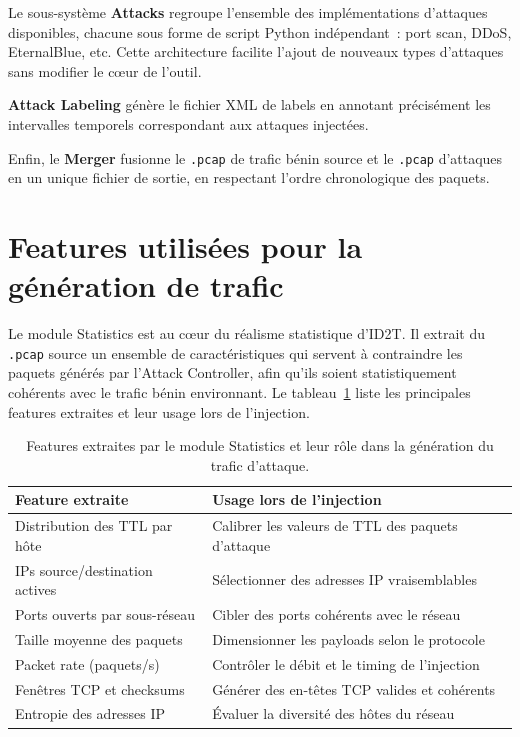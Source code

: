 \documentclass[12pt, a4paper]{report}
\begin{document}
Le sous-système \textbf{Attacks} regroupe l'ensemble des implémentations
d'attaques disponibles, chacune sous forme de script Python indépendant~:
port scan, DDoS, EternalBlue, etc. Cette architecture facilite l'ajout
de nouveaux types d'attaques sans modifier le cœur de l'outil.

\textbf{Attack Labeling} génère le fichier XML de labels en annotant
précisément les intervalles temporels correspondant aux attaques injectées.

Enfin, le \textbf{Merger} fusionne le \texttt{.pcap} de trafic bénin
source et le \texttt{.pcap} d'attaques en un unique fichier de sortie,
en respectant l'ordre chronologique des paquets.



 
\section{Features utilisées pour la génération de trafic}
\label{sec:features}

Le module Statistics est au cœur du réalisme statistique d'ID2T. Il
extrait du \texttt{.pcap} source un ensemble de caractéristiques qui
servent à contraindre les paquets générés par l'Attack Controller,
afin qu'ils soient statistiquement cohérents avec le trafic bénin
environnant. Le tableau~\ref{tab:features} liste les principales
features extraites et leur usage lors de l'injection.

\begin{table}[H]
\centering
\caption{Features extraites par le module Statistics et leur rôle dans
la génération du trafic d'attaque.}
\label{tab:features}
\small
\begin{tabular}{p{5.5cm} p{8.5cm}}
\toprule
\textbf{Feature extraite} & \textbf{Usage lors de l'injection} \\
\midrule
Distribution des TTL par hôte     & Calibrer les valeurs de TTL des paquets d'attaque \\
IPs source/destination actives    & Sélectionner des adresses IP vraisemblables \\
Ports ouverts par sous-réseau     & Cibler des ports cohérents avec le réseau \\
Taille moyenne des paquets        & Dimensionner les payloads selon le protocole \\
Packet rate (paquets/s)           & Contrôler le débit et le timing de l'injection \\
Fenêtres TCP et checksums         & Générer des en-têtes TCP valides et cohérents \\
Entropie des adresses IP          & Évaluer la diversité des hôtes du réseau \\
\bottomrule
\end{tabular}
\end{table}
\end{document}
